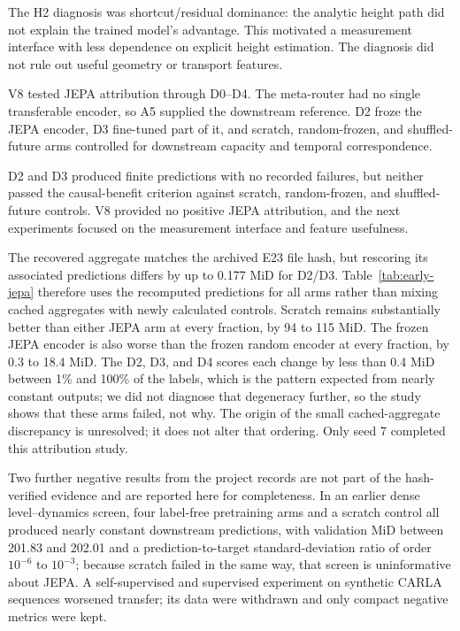 The H2 diagnosis was shortcut/residual dominance: the analytic height path did not explain the trained model's advantage. This motivated a measurement interface with less dependence on explicit height estimation. The diagnosis did not rule out useful geometry or transport features.

V8 tested JEPA attribution through D0--D4. The meta-router had no single transferable encoder, so A5 supplied the downstream reference. D2 froze the JEPA encoder, D3 fine-tuned part of it, and scratch, random-frozen, and shuffled-future arms controlled for downstream capacity and temporal correspondence. 

\begin{table}[htbp]
\centering\small

\caption{V8 seed-7 controls on the same three-fold OOF queries, recomputed from the recovered signed prediction artifacts with one sequence-macro evaluator. All five arms and nominal label fractions appear together. Historical aggregate values for D2/D3 are retained in the source data; their small discrepancy from this recomputation is documented below.}
\label{tab:early-jepa}
\end{table}

D2 and D3 produced finite predictions with no recorded failures, but neither passed the causal-benefit criterion against scratch, random-frozen, and shuffled-future controls. V8 provided no positive JEPA attribution, and the next experiments focused on the measurement interface and feature usefulness. 

The recovered aggregate matches the archived E23 file hash, but rescoring its associated predictions differs by up to 0.177 MiD for D2/D3. Table~\ref{tab:early-jepa} therefore uses the recomputed predictions for all arms rather than mixing cached aggregates with newly calculated controls. Scratch remains substantially better than either JEPA arm at every fraction, by 94 to 115 MiD. The frozen JEPA encoder is also worse than the frozen random encoder at every fraction, by 0.3 to 18.4 MiD. The D2, D3, and D4 scores each change by less than 0.4 MiD between 1\% and 100\% of the labels, which is the pattern expected from nearly constant outputs; we did not diagnose that degeneracy further, so the study shows that these arms failed, not why. The origin of the small cached-aggregate discrepancy is unresolved; it does not alter that ordering. Only seed 7 completed this attribution study.

Two further negative results from the project records are not part of the hash-verified evidence and are reported here for completeness. In an earlier dense level--dynamics screen, four label-free pretraining arms and a scratch control all produced nearly constant downstream predictions, with validation MiD between 201.83 and 202.01 and a prediction-to-target standard-deviation ratio of order $10^{-6}$ to $10^{-3}$; because scratch failed in the same way, that screen is uninformative about JEPA. A self-supervised and supervised experiment on synthetic CARLA sequences worsened transfer; its data were withdrawn and only compact negative metrics were kept.
